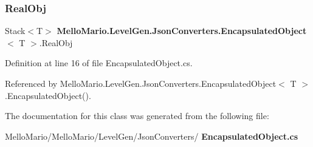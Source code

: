 \subsubsection{Real\+Obj}
{\footnotesize\ttfamily Stack$<$T$>$ \textbf{ Mello\+Mario.\+Level\+Gen.\+Json\+Converters.\+Encapsulated\+Object}$<$ T $>$.Real\+Obj\hspace{0.3cm}{\ttfamily [get]}}



Definition at line 16 of file Encapsulated\+Object.\+cs.



Referenced by Mello\+Mario.\+Level\+Gen.\+Json\+Converters.\+Encapsulated\+Object$<$ T $>$.\+Encapsulated\+Object().



The documentation for this class was generated from the following file\+:\begin{DoxyCompactItemize}
\item 
Mello\+Mario/\+Mello\+Mario/\+Level\+Gen/\+Json\+Converters/\textbf{ Encapsulated\+Object.\+cs}\end{DoxyCompactItemize}
